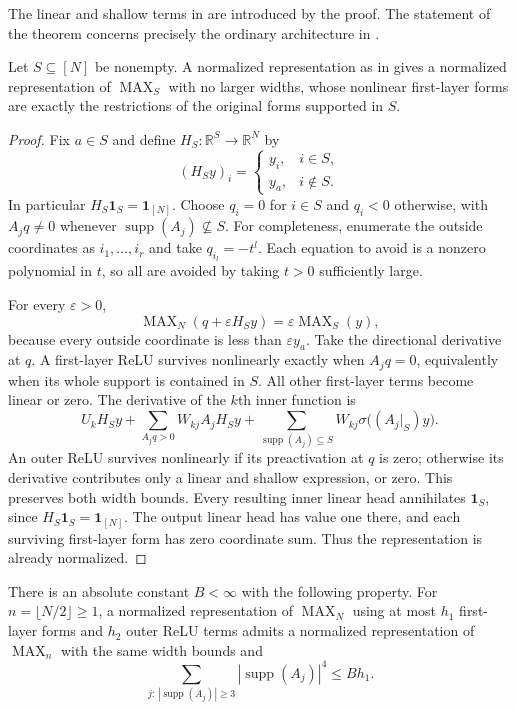 The linear and shallow terms in  are
introduced by the proof.  The statement of the theorem concerns precisely
the ordinary architecture in .

\begin{lemma}\label{lem:clean-coordinate-localization}
Let $S\subseteq[N]$ be nonempty.  A normalized representation as in
 gives a normalized representation of
$\operatorname{MAX}_S$ with no larger widths, whose nonlinear first-layer
forms are exactly the restrictions of the original forms supported in $S$.
\end{lemma}

\begin{proof}
Fix $a\in S$ and define $H_S:\mathbb R^S\to\mathbb R^N$ by
\[
 (H_Sy)_i=
 \begin{cases}y_i,&i\in S,\\y_a,&i\notin S.\end{cases}
\]
In particular $H_S\mathbf1_S=\mathbf1_{[N]}$.
Choose $q_i=0$ for $i\in S$ and $q_i<0$ otherwise, with
$A_jq\ne0$ whenever $\operatorname{supp}(A_j)\not\subseteq S$.
For completeness, enumerate the outside coordinates as $i_1,\ldots,i_r$
and take $q_{i_l}=-t^l$.  Each equation to avoid is a nonzero polynomial
in $t$, so all are avoided by taking $t>0$ sufficiently large.

For every $\varepsilon>0$,
\[
 \operatorname{MAX}_N(q+\varepsilon H_Sy)
 =\varepsilon\operatorname{MAX}_S(y),
\]
because every outside coordinate is less than $\varepsilon y_a$.
Take the directional derivative at $q$.  A first-layer ReLU survives
nonlinearly exactly when $A_jq=0$, equivalently when its whole support
is contained in $S$.  All other first-layer terms become linear or zero.
The derivative of the $k$th inner function is
\[
 U_kH_Sy+\sum_{A_jq>0}W_{kj}A_jH_Sy
 +\sum_{\operatorname{supp}(A_j)\subseteq S}
     W_{kj}\sigma\bigl((A_j|_S)y\bigr).
\]
An outer ReLU survives nonlinearly if its preactivation at $q$ is zero;
otherwise its derivative contributes only a linear and shallow expression,
or zero.  This preserves both width bounds.
Every resulting inner linear head annihilates $\mathbf1_S$, since
$H_S\mathbf1_S=\mathbf1_{[N]}$.  The output linear head has value one
there, and each surviving first-layer form has zero coordinate sum.
Thus the representation is already normalized.
\end{proof}

\begin{lemma}\label{lem:clean-support-regularization}
There is an absolute constant $B<\infty$ with the following property.
For $n=\lfloor N/2\rfloor\ge1$, a normalized representation of
$\operatorname{MAX}_N$ using at most $h_1$ first-layer forms and $h_2$
outer ReLU terms admits a normalized representation of
$\operatorname{MAX}_n$ with the same width bounds and
\[
 \sum_{j:\,|\operatorname{supp}(A_j)|\ge3}
       |\operatorname{supp}(A_j)|^4\le Bh_1.
\]
\end{lemma}

